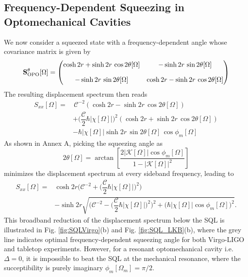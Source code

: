 \subsection{Frequency-Dependent Squeezing in Optomechanical Cavities}
We now consider a squeezed state with a frequency-dependent angle whose covariance matrix is given by
\begin{equation*}
      \mathbf{S}^{\theta}_{\rm OPO}[\Omega] =\begin{pmatrix}
         \cosh 2r  + \sinh 2r \, \cos 2\theta[\Omega]  & -\sinh 2r \, \sin 2\theta[\Omega]  \\[10pt]
        -\sinh 2r \, \sin 2\theta[\Omega]  & \cosh 2r  - \sinh 2r \, \cos 2\theta[\Omega] 
      \end{pmatrix}
\end{equation*}
The resulting displacement spectrum then reads
\begin{equation}
  \begin{split}
      S_{xx}[\Omega] = & \, \mathcal{C}^{-2} (\cosh 2r  - \sinh 2r \, \cos 2\theta[\Omega])\\
      & +  \bigg(\dfrac{\mathcal{C} }{2} \hbar |\chi[\Omega]| \bigg)^2( \cosh 2r  + \sinh 2r \, \cos 2\theta[\Omega]) \\
      & - \hbar |\chi[\Omega]| \sinh 2r \, \sin 2\theta[\Omega] \, \cos \phi_m[\Omega]
  \end{split}
\end{equation}
As shown in Annex A, picking the squeezing angle as
\begin{equation}
  2 \theta[\Omega] = \arctan \left[\dfrac{2|\mathcal{K}[\Omega]|\cos \phi_m[\Omega]}{1 - |\mathcal{K}[\Omega]|^2}\right]
\end{equation}
minimizes the displacement spectrum at every sideband frequency, leading to
\begin{equation}
\begin{split}
  S_{xx}[\Omega] = & \cosh 2r \Bigg(\mathcal{C}^{-2}  + \bigg(\dfrac{\mathcal{C} }{2} \hbar |\chi[\Omega]| \bigg)^2\Bigg)  \\
  & -  \sinh 2r \sqrt{\Bigg(\mathcal{C}^{-2}  - \bigg(\dfrac{\mathcal{C} }{2} \hbar |\chi[\Omega]| \bigg)^2\Bigg)^2 + \bigg(\hbar |\chi[\Omega]|\cos \phi_m[\Omega]\bigg)^2}.
\end{split}
\end{equation}
This broadband reduction of the displacement spectrum below the SQL is illustrated in Fig. \ref{fig:SQLVirgo}(b) and Fig. \ref{fig:SQL_LKB}(b), where the grey line indicates optimal frequency-dependent squeezing angle for both Virgo-LIGO and tabletop experiments. However, for a resonant optomechanical cavity i.e. $\Delta=0$, it is impossible to beat the SQL at the mechanical resonance, where the succeptibility is purely imaginary $\phi_m[\Omega_m] = \pi/2$. \\



